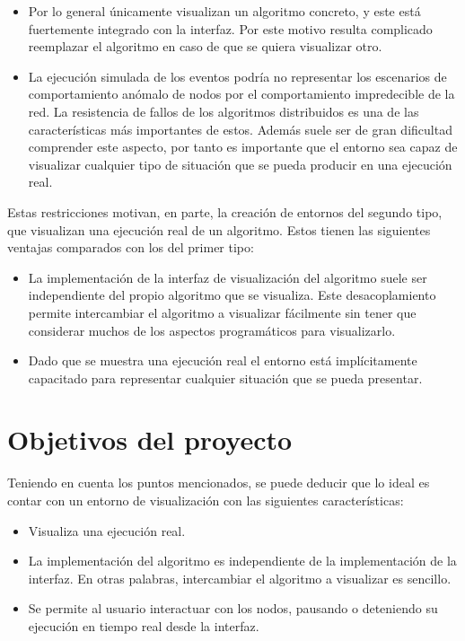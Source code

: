 \newpage

\begin{itemize}
\item Por lo general únicamente visualizan un algoritmo concreto, y este está fuertemente integrado con la interfaz. Por este motivo resulta complicado reemplazar el algoritmo en caso de que se quiera visualizar otro.
\item La ejecución simulada de los eventos podría no representar los escenarios de comportamiento anómalo de nodos por el comportamiento impredecible de la red. La resistencia de fallos de los algoritmos distribuidos es una de las características más importantes de estos. Además suele ser de gran dificultad comprender este aspecto, por tanto es importante que el entorno sea capaz de visualizar cualquier tipo de situación que se pueda producir en una ejecución real.
\end{itemize}

Estas restricciones motivan, en parte, la creación de entornos del segundo tipo, que visualizan una ejecución real de un algoritmo. Estos tienen las siguientes ventajas comparados con los del primer tipo:

\begin{itemize}
\item La implementación de la interfaz de visualización del algoritmo suele ser independiente del propio algoritmo que se visualiza. Este desacoplamiento permite intercambiar el algoritmo a visualizar fácilmente sin tener que considerar muchos de los aspectos programáticos para visualizarlo.
\item Dado que se muestra una ejecución real el entorno está implícitamente capacitado para representar cualquier situación que se pueda presentar.
\end{itemize}

\section{Objetivos del proyecto}

Teniendo en cuenta los puntos mencionados, se puede deducir que lo ideal es contar con un entorno de visualización con las siguientes características:

\begin{itemize}
\item Visualiza una ejecución real.
\item La implementación del algoritmo es independiente de la implementación de la interfaz. En otras palabras, intercambiar el algoritmo a visualizar es sencillo.
\item Se permite al usuario interactuar con los nodos, pausando o deteniendo su ejecución en tiempo real desde la interfaz.
\end{itemize}

